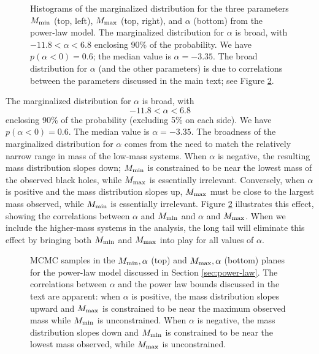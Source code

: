 \documentclass[preprint]{aastex}
\newcommand{\Mmin}{M_{\textnormal{min}}}
\newcommand{\Mmax}{M_{\textnormal{max}}}
\begin{document}
\begin{figure}
  \begin{center}
  \end{center}
  \caption{\label{fig:power-law} Histograms of the marginalized
    distribution for the three parameters $\Mmin$ (top, left), $\Mmax$
    (top, right), and $\alpha$ (bottom) from the power-law model.  The
    marginalized distribution for $\alpha$ is broad, with $-11.8 <
    \alpha < 6.8$ enclosing 90\% of the probability.  We have
    $p(\alpha < 0) = 0.6$; the median value is $\alpha = -3.35$.  The
    broad distribution for $\alpha$ (and the other parameters) is due
    to correlations between the parameters discussed in the main text;
    see Figure \ref{fig:power-law-2D}.}
\end{figure}

The marginalized distribution for $\alpha$ is broad, with
\begin{equation}
  -11.8 < \alpha < 6.8
\end{equation}
enclosing 90\% of the probability (excluding 5\% on each side).  We
have $p(\alpha < 0) = 0.6$.  The median value is $\alpha = -3.35$.
The broadness of the marginalized distribution for $\alpha$ comes from
the need to match the relatively narrow range in mass of the
low-mass systems.  When $\alpha$ is negative, the resulting mass
distribution slopes down; $\Mmin$ is constrained to be near the lowest
mass of the observed black holes, while $\Mmax$ is essentially
irrelevant.  Conversely, when $\alpha$ is positive and the mass
distribution slopes up, $\Mmax$ must be close to the largest mass
observed, while $\Mmin$ is essentially irrelevant.  Figure
\ref{fig:power-law-2D} illustrates this effect, showing the
correlations between $\alpha$ and $\Mmin$ and $\alpha$ and $\Mmax$.
When we include the higher-mass systems in the analysis, the long tail
will eliminate this effect by bringing both $\Mmin$ and $\Mmax$ into
play for all values of $\alpha$.

\begin{figure}
  \begin{center}
  \end{center}
  \caption{\label{fig:power-law-2D} MCMC samples in the $\Mmin,
    \alpha$ (top) and $\Mmax, \alpha$ (bottom) planes for the
    power-law model discussed in Section \ref{sec:power-law}.  The
    correlations between $\alpha$ and the power law bounds discussed
    in the text are apparent: when $\alpha$ is positive, the mass
    distribution slopes upward and $\Mmax$ is constrained to be near
    the maximum observed mass while $\Mmin$ is unconstrained.  When
    $\alpha$ is negative, the mass distribution slopes down and
    $\Mmin$ is constrained to be near the lowest mass observed, while
    $\Mmax$ is unconstrained. }
\end{figure}
\end{document}
